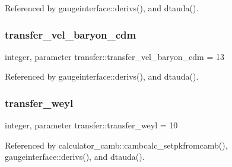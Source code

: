 Referenced by gaugeinterface\+::derivs(), and dtauda().

\mbox{\label{namespacetransfer_a355c8bcd1bf73a87d603cd7f77c702d0}} 
\subsubsection{\texorpdfstring{transfer\+\_\+vel\+\_\+baryon\+\_\+cdm}{transfer\_vel\_baryon\_cdm}}
{\footnotesize\ttfamily integer, parameter transfer\+::transfer\+\_\+vel\+\_\+baryon\+\_\+cdm = 13}



Referenced by gaugeinterface\+::derivs(), and dtauda().

\mbox{\label{namespacetransfer_adc4f1fee4e89ed92a0865f3854118eca}} 
\subsubsection{\texorpdfstring{transfer\+\_\+weyl}{transfer\_weyl}}
{\footnotesize\ttfamily integer, parameter transfer\+::transfer\+\_\+weyl = 10}



Referenced by calculator\+\_\+camb\+::cambcalc\+\_\+setpkfromcamb(), gaugeinterface\+::derivs(), and dtauda().

